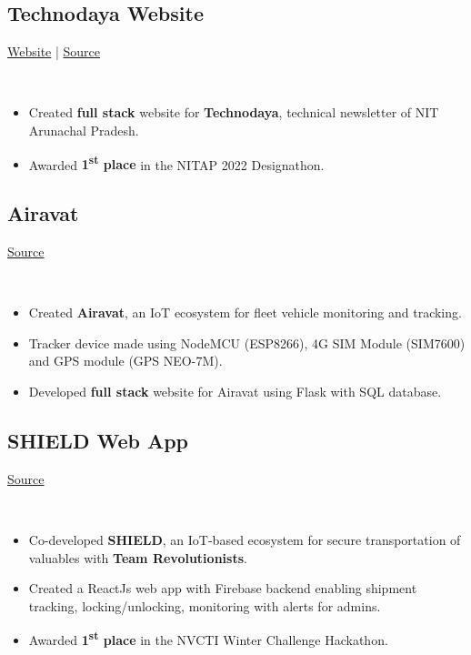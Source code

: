 \documentclass[]{article}
\newcommand{\subheading}[2]{
  {\subsection{#1}
  \hfill{#2}}\\
  \vspace{2pt}
}
\newenvironment{tightemize}{
\vspace{-4pt}\begin{itemize}\itemsep3pt \parskip0pt \parsep0pt}
{\end{itemize}\vspace{-\topsep}}
\begin{document}
\begin{multicols}{2}
\begin{flushleft}
    \subheading{Technodaya Website}{
      \href{https://technodaya.netlify.app}{Website} | 
      \href{https://github.com/PursottamSah6003/Designathon-for-one}{Source}
    }
    \begin{tightemize}
      \item Created \textbf{full stack} website for \textbf{Technodaya}, technical newsletter of NIT Arunachal Pradesh.
      \item Awarded \textbf{1\textsuperscript{st} place} in the NITAP 2022 Designathon.
    \end{tightemize}

    \subheading{Airavat}{\href{https://github.com/tripathics/airavat}{Source}}
    \begin{tightemize}
      \item Created \textbf{Airavat}, an IoT ecosystem for fleet vehicle monitoring and tracking.
      \item Tracker device made using NodeMCU (ESP8266), 4G SIM Module (SIM7600) and GPS module (GPS NEO-7M).
      \item Developed \textbf{full stack} website for Airavat using Flask with SQL database.
    \end{tightemize}

    \subheading{SHIELD Web App}{\href{https://github.com/tripathics}{Source}}
    \begin{tightemize}
      \item Co-developed \textbf{SHIELD}, an IoT-based ecosystem for secure transportation of valuables with \textbf{Team Revolutionists}. 
      \item Created a ReactJs web app with Firebase backend enabling shipment tracking, locking/unlocking, monitoring with alerts for admins.
      \item Awarded \textbf{1\textsuperscript{st} place} in the NVCTI Winter Challenge Hackathon.
    \end{tightemize}


    


\end{flushleft}
\end{multicols}
\end{document}
